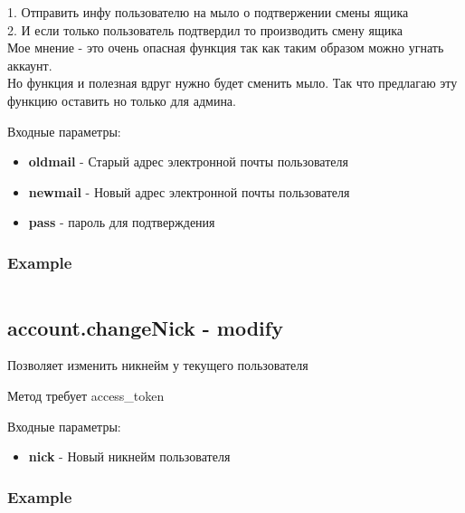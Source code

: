 1. Отправить инфу пользователю на мыло о подтвержении смены ящика \\
2. И если только пользователь подтвердил то производить смену ящика \\

Мое мнение - это очень опасная функция так как таким образом можно угнать аккаунт. \\
Но функция и полезная вдруг нужно будет сменить мыло. Так что предлагаю эту функцию оставить но только для админа.

Входные параметры:
\begin{itemize}
  \item \textbf{oldmail} - Старый адрес электронной почты пользователя
  \item \textbf{newmail} - Новый адрес электронной почты пользователя
  \item \textbf{pass} - пароль для подтверждения
\end{itemize}

\subsubsection{Example}
\begin{Verbatim}[frame=single]

\end{Verbatim}

\subsection{account.changeNick - modify}
Позволяет изменить никнейм у текущего пользователя

Метод требует access\_token

Входные параметры:
\begin{itemize}
  \item \textbf{nick} - Новый никнейм пользователя
\end{itemize}

\subsubsection{Example}
\begin{Verbatim}[frame=single]

\end{Verbatim}
